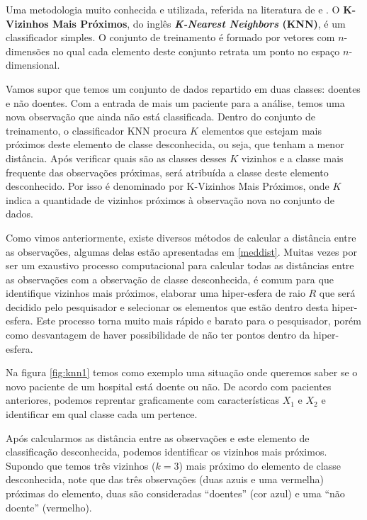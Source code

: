 \documentclass[
  openany]{book}
\begin{document}
Uma metodologia muito conhecida e utilizada, referida na literatura de \citep{bhattacharya1981application} e \citep{bhattacharya2005geometric}. O \textbf{K-Vizinhos Mais Próximos}, do inglês \textbf{\emph{K-Nearest Neighbors} (KNN)}, é um classificador simples. O conjunto de treinamento é formado por vetores com \(n\)-dimensões no qual cada elemento deste conjunto retrata um ponto no espaço \(n\)-dimensional.

Vamos supor que temos um conjunto de dados repartido em duas classes: doentes e não doentes. Com a entrada de mais um paciente para a análise, temos uma nova observação que ainda não está classificada. Dentro do conjunto de treinamento, o classificador KNN procura \(K\) elementos que estejam mais próximos deste elemento de classe desconhecida, ou seja, que tenham a menor distância. Após verificar quais são as classes desses \(K\) vizinhos e a classe mais frequente das observações próximas, será atribuída a classe deste elemento desconhecido. Por isso é denominado por K-Vizinhos Mais Próximos, onde \(K\) indica a quantidade de vizinhos próximos à observação nova no conjunto de dados.

Como vimos anteriormente, existe diversos métodos de calcular a distância entre as observações, algumas delas estão apresentadas em \ref{meddist}. Muitas vezes por ser um exaustivo processo computacional para calcular todas as distâncias entre as observações com a observação de classe desconhecida, é comum para que identifique vizinhos mais próximos, elaborar uma hiper-esfera de raio \(R\) que será decidido pelo pesquisador e selecionar os elementos que estão dentro desta hiper-esfera. Este processo torna muito mais rápido e barato para o pesquisador, porém como desvantagem de haver possibilidade de não ter pontos dentro da hiper-esfera.

Na figura \ref{fig:knn1} temos como exemplo uma situação onde queremos saber se o novo paciente de um hospital está doente ou não. De acordo com pacientes anteriores, podemos reprentar graficamente com características \(X_1\) e \(X_2\) e identificar em qual classe cada um pertence.

Após calcularmos as distância entre as observações e este elemento de classificação desconhecida, podemos identificar os vizinhos mais próximos. Supondo que temos três vizinhos (\(k=3\)) mais próximo do elemento de classe desconhecida, note que das três observações (duas azuis e uma vermelha) próximas do elemento, duas são consideradas ``doentes'' (cor azul) e uma ``não doente'' (vermelho).
\end{document}
